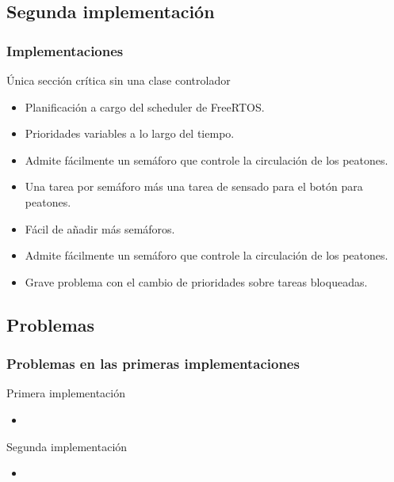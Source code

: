 \subsection{Segunda implementación}
\begin{frame}
\frametitle{Implementaciones}
\begin{block}{Única sección crítica sin una clase controlador}
	\begin{itemize}
		\item Planificación a cargo del scheduler de FreeRTOS.
		\item Prioridades variables a lo largo del tiempo.
		\item Admite fácilmente un semáforo que controle la circulación de los peatones.
		\item Una tarea por semáforo más una tarea de sensado para el botón para peatones.
		\item Fácil de añadir más semáforos.
		\item Admite fácilmente un semáforo que controle la circulación de los peatones.
		\item Grave problema con el cambio de prioridades sobre tareas bloqueadas.

	\end{itemize}
\end{block}
\end{frame}

\subsection{Problemas}
\begin{frame}
\frametitle{Problemas en las primeras implementaciones}
\begin{block}{Primera implementación}
	\begin{itemize}
		\item
	\end{itemize}
\end{block}
\begin{block}{Segunda implementación}
	\begin{itemize}
		\item
	\end{itemize}
\end{block}
\end{frame}


